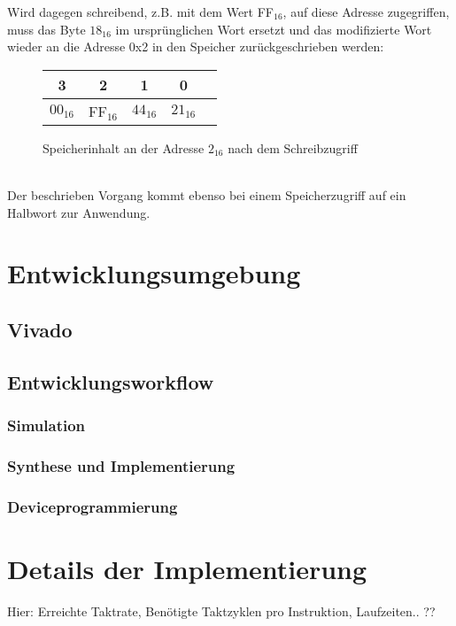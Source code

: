 Wird dagegen schreibend, z.B. mit dem Wert FF$_{16}$,  auf diese Adresse zugegriffen, muss das Byte $18_{16}$ im ursprünglichen Wort ersetzt und das modifizierte Wort wieder an die Adresse 0x2 in den Speicher zurückgeschrieben werden:
\begin{figure} [htpb]
    \centering
        \begin{tabular}{|c|c|c|c|c|}
            \multicolumn{1}{c}{3} & \multicolumn{1}{c}{2} &  \multicolumn{1}{c}{1}& \multicolumn{1}{c}{0}\\
            \hline
            $00_{16}$ & FF$_{16}$ & $44_{16}$ & $21_{16}$\\
            \hline
        \end{tabular}
        \caption{Speicherinhalt an der Adresse $2_{16}$ nach dem Schreibzugriff}
\end{figure}\\

Der beschrieben Vorgang kommt ebenso bei einem Speicherzugriff auf ein Halbwort zur Anwendung.



\section{Entwicklungsumgebung}
\subsection{Vivado}
\subsection{Entwicklungsworkflow}
\subsubsection{Simulation}
\subsubsection{Synthese und Implementierung}
\subsubsection{Deviceprogrammierung}


\section{Details der Implementierung}
Hier: Erreichte Taktrate, Benötigte Taktzyklen pro
Instruktion, Laufzeiten.. ??
